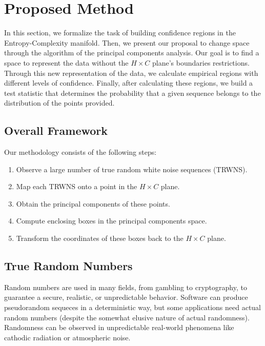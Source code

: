 \documentclass[alpha-refs]{wiley-article}
\begin{document}
\section{Proposed Method}\label{Sec:Proposal}

In this section, we formalize the task of building confidence regions in the Entropy-Complexity manifold.
Then, we present our proposal to change space through the algorithm of the principal components analysis.
Our goal is to find a space to represent the data without the $H\times C$ plane's boundaries restrictions.
Through this new representation of the data, we calculate empirical regions with different levels of confidence.
Finally, after calculating these regions, we build a test statistic that determines the probability that a given sequence belongs to the distribution of the points provided.

\subsection{Overall Framework}\label{Sec:OverallFramework}

Our methodology consists of the following steps:
\begin{enumerate}
\item\label{item:Methodology1} Observe a large number of true random white noise sequences (TRWNS).
\item\label{item:Methodology2} Map each TRWNS onto a point in the $H\times C$ plane.
\item\label{item:Methodology3} Obtain the principal components of these points.
\item\label{item:Methodology4} Compute enclosing boxes in the principal components space.
\item\label{item:Methodology5} Transform the coordinates of these boxes back to the $H\times C$ plane.
\end{enumerate}

\subsection{True Random Numbers}\label{Sec:TRNG}

Random numbers are used in many fields, from gambling to cryptography, to guarantee a secure, realistic, or unpredictable behavior. 
Software can produce pseudorandom sequeces in a deterministic way, but some applications need actual random numbers (despite the somewhat elusive nature of actual randomness).
Randomness can be observed in unpredictable real-world phenomena like cathodic radiation or atmospheric noise.
\end{document}
